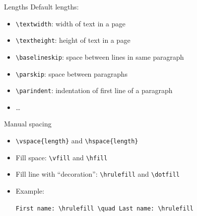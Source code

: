 \documentclass[11pt]{beamer}
\newcommand{\bs}{\textbackslash}
\begin{document}
\begin{frame}{Lengths}
  Default lengths:

  \vspace{0.5cm}
  \begin{itemize}
    \item \texttt{\bs textwidth}: width of text in a page
    \item \texttt{\bs textheight}: height of text in a page
    \item \texttt{\bs baselineskip}: space between lines in same paragraph
    \item \texttt{\bs parskip}: space between paragraphs
    \item \texttt{\bs parindent}: indentation of first line of a paragraph
    \item \dots
  \end{itemize}
\end{frame}

\begin{frame}{Manual spacing}
  \begin{itemize}
    \item \texttt{\bs vspace\{length\}} and \texttt{\bs hspace\{length\}}

    \vspace{0.2cm}
    \item Fill space: \texttt{\bs vfill} and \texttt{\bs hfill}

    \vspace{0.2cm}
    \item Fill line with ``decoration'':
          \texttt{\bs hrulefill} and \texttt{\bs dotfill}

    \vspace{0.2cm}
    \item Example:
    
          \vspace{0.2cm}
          \begin{center}
          \texttt{First name: \bs hrulefill \bs quad Last name: \bs hrulefill}
          \end{center}
  \end{itemize}
\end{frame}
\end{document}
